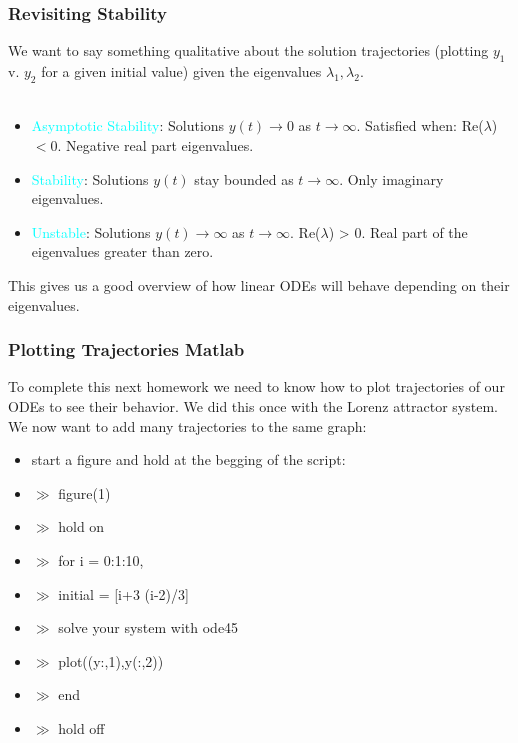 \documentclass{beamer}
\begin{document}
\begin{frame}
\frametitle{Revisiting Stability} 

We want to say something qualitative about the solution trajectories (plotting $y_1$ v. $y_2$ for a given initial value) given the eigenvalues $ \lambda_1,\lambda_2$.\\
\ \\
\begin{itemize}
\item \textcolor{cyan}{Asymptotic Stability}: Solutions $y(t) \rightarrow 0$ as $ t\rightarrow \infty$. Satisfied when: Re($\lambda$) $< 0$. Negative real part eigenvalues.
\item \textcolor{cyan}{Stability}: Solutions $y(t)$ stay bounded as $ t \rightarrow \infty $. Only imaginary eigenvalues. 
\item \textcolor{cyan}{Unstable}: Solutions $y(t) \rightarrow \infty$ as $ t\rightarrow \infty$.  Re($\lambda$) > 0. Real part of the eigenvalues greater than zero.
\end{itemize}

This gives us a good overview of how linear ODEs will behave depending on their eigenvalues. 
\end{frame}

\begin{frame}
\frametitle{Plotting Trajectories Matlab}

To complete this next homework we need to know how to plot trajectories of our ODEs to see their behavior. We did this once with the Lorenz attractor system. We now want to add many trajectories to the same graph: 

\begin{itemize}
\item start a figure and hold at the begging of the script: 
\item $\gg$ figure(1)
\item $\gg$ hold on 
\item $ \gg$ for i = 0:1:10,
\item $\gg$ initial = [i+3 (i-2)/3]
\item $\gg$ solve your system with ode45 
\item $\gg$ plot((y:,1),y(:,2))
\item $\gg$ end 
\item $\gg$ hold off 
\end{itemize}

\end{frame}
\end{document}
